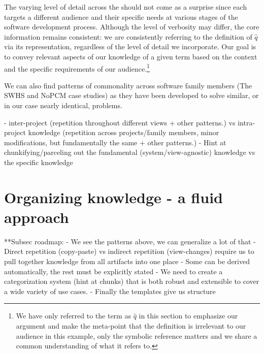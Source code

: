 The varying level of detail across the \sfs{} should not come as a surprise 
since each \sf{} targets a different audience and their specific needs at 
various stages of the software development process. Although the level of 
verbosity may differ, the core information remains consistent: we are 
consistently referring to the definition of $\hat{q}$ via its representation, 
regardless of the level of detail we incorporate. Our goal is to convey 
relevant aspects of our knowledge of a given term based on the context and the 
specific requirements of our audience.\footnote{We have only referred to the 
term as $\hat{q}$ in this section to emphasize our argument and make the 
meta-point that the definition is irrelevant to our audience in this example, 
only the symbolic reference matters and we share a common understanding of what 
it refers to.}



We can also find patterns of commonality across software family members (The 
SWHS and NoPCM case studies) as they have been developed to solve similar, or 
in our case nearly identical, problems.

- inter-project (repetition throughout different views + other patterns.)
  vs intra-project knowledge (repetition across projects/family members,
  minor modifications, but fundamentally the same + other patterns.)
- Hint at chunkifying/parceling out the fundamental (system/view-agnostic)
knowledge vs the specific knowledge


\section{Organizing knowledge - a fluid approach}
  **Subsec roadmap:
    - We see the patterns above, we can generalize a lot of that
    - Direct repetition (copy-paste) vs indirect repetition (view-changes)
    require us to pull together knowledge from all artifacts into one place
    - Some can be derived automatically, the rest must be explicitly stated
    - We need to create a categorization system (hint at chunks) that is both
    robust and extensible to cover a wide variety of use cases.
    - Finally the templates give us structure

